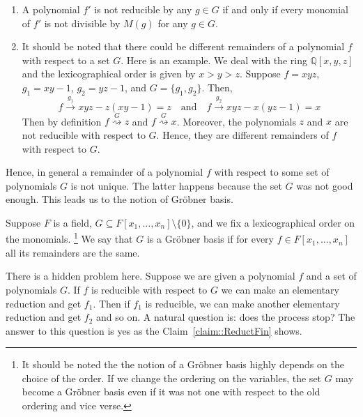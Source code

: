 \begin{remarks}
\begin{enumerate}
\item A polynomial $f'$ is not reducible by any $g\in G$ if and only if every monomial of $f'$ is not divisible by $M(g)$ for any $g\in G$.

\item It should be noted that there could be different remainders of a polynomial $f$ with respect to a set $G$.
Here is an example.
We deal with the ring $\mathbb Q[x, y, z]$ and the lexicographical order is given by $x > y > z$.
Suppose $f = xyz$, $g_1 = xy - 1$, $g_2 = yz - 1$, and $G = \{g_1, g_2\}$.
Then,
\[
f\stackrel{g_1}{\longrightarrow}xyz - z(xy - 1) = z
\quad\text{and}\quad
f\stackrel{g_2}{\longrightarrow}xyz - x(yz - 1) = x
\]
Then by definition $f\stackrel{G}{\rightsquigarrow} z$ and $f\stackrel{G}{\rightsquigarrow} x$.
Moreover, the polynomials $z$ and $x$ are not reducible with respect to $G$.
Hence, they are different remainders of $f$ with respect to $G$.
\end{enumerate}
\end{remarks}

Hence, in general a remainder of a polynomial $f$ with respect to some set of polynomials $G$ is not unique.
The latter happens because the set $G$ was not good enough.
This leads us to the notion of Gr\"obner basis.

\begin{definition}
Suppose $F$ is a field, $G\subseteq F[x_1,\ldots,x_n]\setminus\{0\}$, and we fix a lexicographical order on the monomials.%
\footnote{It should be noted the the notion of a Gr\"obner basis highly depends on the choice of the order.
If we change the ordering on the variables, the set $G$ may become a Gr\"obner basis even if it was not one with respect to the old ordering and vice verse.}
We say that $G$ is a Gr\"obner basis if for every $f\in F[x_1,\ldots,x_n]$ all its remainders are the same.
\end{definition}

There is a hidden problem here.
Suppose we are given a polynomial $f$ and a set of polynomials $G$.
If $f$ is reducible with respect to $G$ we can make an elementary reduction and get $f_1$.
Then if $f_1$ is reducible, we can make another elementary reduction and get $f_2$ and so on.
A natural question is: does the process stop?
The answer to this question is yes as the Claim~\ref{claim::ReductFin} shows.

